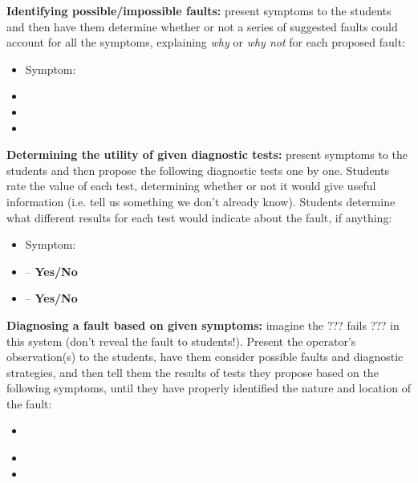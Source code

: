 \vskip 10pt


\noindent
{\bf Identifying possible/impossible faults:} present symptoms to the students and then have them determine whether or not a series of suggested faults could account for all the symptoms, explaining {\it why} or {\it why not} for each proposed fault:

\begin{itemize}
\item{} Symptom: {\it }
\item{} 
\item{} 
\item{} 
\end{itemize}


\vskip 10pt


\noindent
{\bf Determining the utility of given diagnostic tests:} present symptoms to the students and then propose the following diagnostic tests one by one.  Students rate the value of each test, determining whether or not it would give useful information (i.e. tell us something we don't already know).  Students determine what different results for each test would indicate about the fault, if anything:

\begin{itemize}
\item{} Symptom: {\it }
\item{}  -- {\bf Yes/No}
\item{}  -- {\bf Yes/No}
\end{itemize}


\vskip 10pt


\noindent
{\bf Diagnosing a fault based on given symptoms:} imagine the ??? fails ??? in this system (don't reveal the fault to students!).  Present the operator's observation(s) to the students, have them consider possible faults and diagnostic strategies, and then tell them the results of tests they propose based on the following symptoms, until they have properly identified the nature and location of the fault:

\begin{itemize}
\item{} {\it }
\item{} 
\item{} 
\end{itemize}



